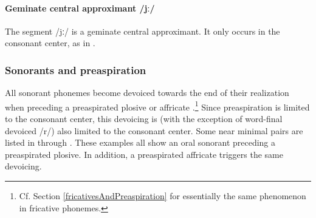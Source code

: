 \paragraph{Geminate central approximant /jː/}
The segment /jː/ is a geminate central approximant. It only occurs in the consonant center, as in .


\subsubsection{Sonorants and preaspiration}\label{sonorantsAndPreaspiration}
All sonorant phonemes become devoiced towards the end of their realization when preceding a preaspirated plosive or affricate%
.\footnote{Cf. Section \ref{fricativesAndPreaspiration} for essentially the same phenomenon in fricative phonemes.} Since preaspiration is limited to the consonant center, this devoicing is (with the exception of word-final devoiced /r/) also limited to the consonant center. Some near minimal pairs are listed in  through . 
These examples all show an oral sonorant preceding a preaspirated plosive. 
In addition, a preaspirated affricate triggers the same devoicing. 




